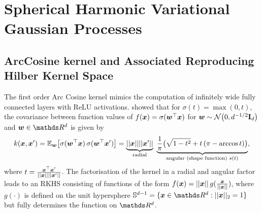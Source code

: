 \chapter{Spherical Harmonic Variational Gaussian Processes}

\section{ArcCosine kernel and Associated Reproducing Hilber Kernel Space}
The first order Arc Cosine kernel mimics the computation of infinitely wide fully connected layers with ReLU activations. \citet{cho2009kernel} showed that for $\sigma(t) = \max(0, t)$, the covariance between function values of $f(\bm{x}) = \sigma(\bm{w}^\top \bm{x})$ for $\vw \sim \NormDist{0, d^{-1/2} \Eye_d}$ and $\vw \in \Reals^d$ is given by
\begin{equation}
\label{eq:arccosine}
    k(\vx, \vx') = \Exp{\vw}{\sigma(\vw^\top \vx)\, \sigma(\vw^\top \vx')} = \underbrace{\norm{\vx} \norm{\vx'}}_{\text{radial}}\ \underbrace{\frac{1}{\pi}\big( \sqrt{1 - t^2} + t\, (\pi - \arccos t) \big)}_{\text{angular (shape function) } s(t)},
\end{equation}
where $t = \frac{\bm{x}^\top \bm{x}'}{\lvert\lvert \bm{x}\rvert\rvert\lvert\lvert \bm{x}'\rvert\rvert}$. The factorisation of the kernel in a radial and angular factor leads to an RKHS consisting of functions of the form $f(\bm{x}) = \lvert\lvert \bm{x}\rvert\rvert\,g(\frac{\bm{x}}{\lvert\lvert \bm{x}\rvert\rvert})$, where $g(\cdot)$ is defined on the unit hypersphere $\dsphere = \{\vx \in \Reals^d: \norm{\vx}_2 = 1\}$ but fully determines the function on $\Reals^d$.

